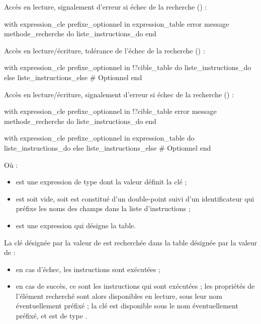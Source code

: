 {{{Accès en lecture, signalement d'erreur si échec de la recherche () :
\begin{galgascode}
with expression_cle prefixe_optionnel in expression_table
error message methode_recherche
do liste_instructions_do
end
\end{galgascode}



Accès en lecture/écriture, tolérance de l'échec de la recherche () :
\begin{galgascode}
with expression_cle prefixe_optionnel in !?cible_table
do liste_instructions_do
else liste_instructions_else # Optionnel
end
\end{galgascode}

Accès en lecture/écriture, signalement d'erreur si échec de la recherche () :
\begin{galgascode}
with expression_cle prefixe_optionnel in !?cible_table
error message methode_recherche
do liste_instructions_do
end
\end{galgascode}






\begin{galgascode}
with expression_cle prefixe_optionnel in expression_table
do liste_instructions_do
else liste_instructions_else # Optionnel
end
\end{galgascode}

Où :
\begin{itemize}
  \item {} est une expression de type  dont la valeur définit la clé ;
  \item {} est soit vide, soit est constitué d'un double-point \galgast{:} suivi d'un identificateur qui préfixe les noms des champs dans la liste d'instructions  ;
  \item {} est une expression qui désigne la table.
\end{itemize}

La clé désignée par la valeur de  est recherchée dans la table désignée par la valeur de  :
\begin{itemize}
  \item en cas d'échec, les instructions  sont exécutées ;
  \item en cas de succès, ce sont les instructions  qui sont exécutées ; les propriétés de l'élément recherché sont alors disponibles en lecture, sous leur nom éventuellement préfixé ; la clé est disponible sous le nom  éventuellement préfixé, et est de type .
\end{itemize}

}}}
